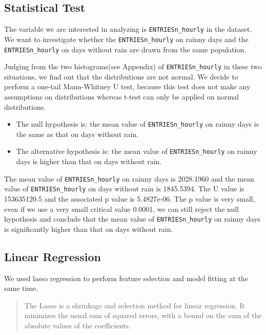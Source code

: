 \documentclass{article}
\begin{document}
    \subsection{Statistical Test}\label{statistical-test}

The variable we are interested in analyzing is \texttt{ENTRIESn\_hourly}
in the dataset. We want to investigate whether the
\texttt{ENTRIESn\_hourly} on rainny days and the
\texttt{ENTRIESn\_hourly} on days without rain are drawn from the same
population.

Judging from the two histograms(see Appendix) of
\texttt{ENTRIESn\_hourly} in these two situations, we find out that the
distributions are not normal. We decide to perform a one-tail
Mann-Whitney U test, because this test does not make any assumptions on
distributions whereas t-test can only be applied on normal
distributions.

\begin{itemize}
\itemsep1pt\parskip0pt
\item
  The null hypothesis is: the mean value of \texttt{ENTRIESn\_hourly} on
  rainny days is the same as that on days without rain.\\
\item
  The alternative hypothesis is: the mean value of
  \texttt{ENTRIESn\_hourly} on rainny days is higher than that on days
  without rain.
\end{itemize}

The mean value of \texttt{ENTRIESn\_hourly} on rainny days is 2028.1960
and the mean value of \texttt{ENTRIESn\_hourly} on days without rain is
1845.5394. The U value is 153635120.5 and the associated p value is
5.4827e-06. The p value is very small, even if we use a very small
critical value 0.0001, we can still reject the null hypothesis and
conclude that the mean value of \texttt{ENTRIESn\_hourly} on rainny days
is significantly higher than that on days without rain.

    \subsection{Linear Regression}\label{linear-regression}

We used lasso regression to perform feature selection and model fitting
at the same time.

\begin{quote}
The Lasso is a shrinkage and selection method for linear regression. It
minimizes the usual sum of squared errors, with a bound on the sum of
the absolute values of the coefficients.
\end{quote}
\end{document}
